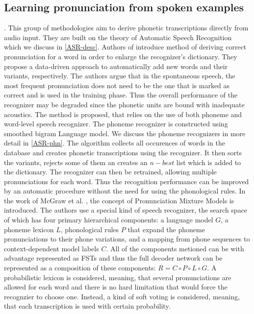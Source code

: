 \subsection{Learning pronunciation from spoken examples}.
\label{pronunc-spoken}
This group of methodologies aim to derive phonetic transcriptions directly from audio input.
They are built on the theory of Automatic Speech Recognition which we discuss in \ref{ASR-desc}.
Authors of \cite{slobada1996dictionary} introduce method of deriving correct pronunciation for a word in order to enlarge the recognizer's dictionary.
They propose a data-driven approach to automatically add new words and their variants, respectively.
The authors argue that in the spontaneous speech, the most frequent pronunciation does not need to be the one that is marked as correct and is used in the training phase.
Thus the overall performance of the recognizer may be degraded since the phonetic units are bound with inadequate acoustics.
The method is proposed, that relies on the use of both phoneme and word-level speech recognizer.
The phoneme recognizer is constructed using smoothed bigram Language model.
We discuss the phoneme recognizers in more detail in \ref{ASR-phn}.
The algorithm collects all occurences of words in the database and creates phonetic transcriptions using the recognizer.
It then sorts the variants, rejects some of them an creates an $n-best$ list which is added to the dictionary.
The recognizer can then be retrained, allowing multiple pronunciations for each word.
Thus the recognition performance can be improved by an automatic procedure without the need for using the phonological rules.
\linebreak\linebreak
In the work of McGraw et al. \cite{mcgraw2013learning}, the concept of Pronunciation Mixture Models is introduced.
The authors use a special kind of speech recognizer, the search space of which has four primary hierarchical components: a language model $G$, a phoneme lexicon $L$, phonological rules $P$ that expand the phoneme pronunciations to their phone variations, and a mapping from phone sequences to context-dependent model labels
$C$.
All of the components metioned can be with advantage represented as FSTs and thus the full decoder network can be represented as a composition of these components: $R = C\circ P \circ L \circ G$.
A probabilistic lexicon is considered, meaning, that several pronunciations are allowed for each word and there is no hard limitation that would force the recognzier to choose one.
Instead, a kind of soft voting is considered, meaning, that each transcription is used with certain probability.
